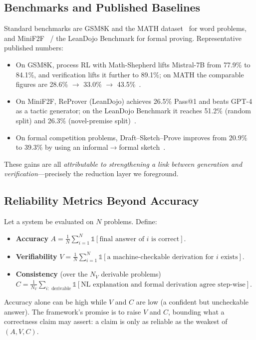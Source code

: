 \documentclass[11pt]{article}
\begin{document}
\subsection{Benchmarks and Published Baselines}
\label{sec:bench}
Standard benchmarks are GSM8K and the MATH dataset~\cite{hendrycks2021measuring}
for word problems, and MiniF2F~\cite{zheng2021minif2f} / the LeanDojo Benchmark for
formal proving. Representative published numbers:
\begin{itemize}
    \item On GSM8K, process RL with Math-Shepherd lifts Mistral-7B from 77.9\% to
          84.1\%, and verification lifts it further to 89.1\%; on MATH the comparable
          figures are 28.6\% $\rightarrow$ 33.0\% $\rightarrow$ 43.5\%~\cite{wang2024mathshepherd}.
    \item On MiniF2F, ReProver (LeanDojo) achieves 26.5\% Pass@1 and beats GPT-4 as a
          tactic generator; on the LeanDojo Benchmark it reaches 51.2\% (random split)
          and 26.3\% (novel-premise split)~\cite{yang2023leandojo}.
    \item On formal competition problems, Draft--Sketch--Prove improves from 20.9\% to
          39.3\% by using an informal$\rightarrow$formal sketch~\cite{jiang2023draft}.
\end{itemize}
These gains are all \emph{attributable to strengthening a link between generation and
verification}---precisely the reduction layer we foreground.

\subsection{Reliability Metrics Beyond Accuracy}
\label{sec:metrics}
Let a system be evaluated on $N$ problems. Define:
\begin{itemize}
    \item \textbf{Accuracy}
          $A = \frac{1}{N}\sum_{i=1}^{N}\mathbb{1}[\text{final answer of }i\text{ is correct}].$
    \item \textbf{Verifiability}
          $V = \frac{1}{N}\sum_{i=1}^{N}\mathbb{1}[\text{a machine-checkable derivation for }i\text{ exists}].$
    \item \textbf{Consistency} (over the $N_V$ derivable problems)
          $C = \frac{1}{N_V}\sum_{i:\text{ derivable}}\mathbb{1}[\text{NL explanation and formal derivation agree step-wise}].$
\end{itemize}
Accuracy alone can be high while $V$ and $C$ are low (a confident but uncheckable
answer). The framework's promise is to raise $V$ and $C$, bounding what a correctness
claim may assert: a claim is only as reliable as the weakest of $(A, V, C)$.
\end{document}
